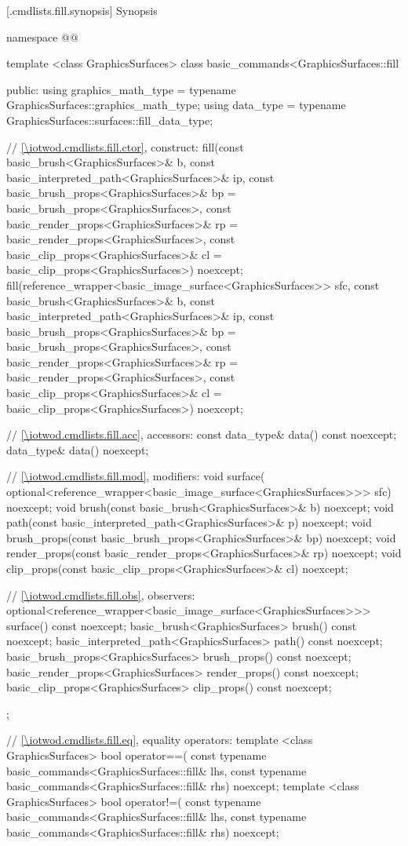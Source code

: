  [\iotwod.cmdlists.fill.synopsis] {Synopsis}
\begin{codeblock}
namespace @\fullnamespace{}@ {
  template <class GraphicsSurfaces>
  class basic_commands<GraphicsSurfaces::fill {
  public:
    using graphics_math_type = typename GraphicsSurfaces::graphics_math_type;
    using data_type = typename GraphicsSurfaces::surfaces::fill_data_type;

    // \ref{\iotwod.cmdlists.fill.ctor}, construct:
    fill(const basic_brush<GraphicsSurfaces>& b,
      const basic_interpreted_path<GraphicsSurfaces>& ip,
      const basic_brush_props<GraphicsSurfaces>& bp = 
      basic_brush_props<GraphicsSurfaces>{},
      const basic_render_props<GraphicsSurfaces>& rp = 
      basic_render_props<GraphicsSurfaces>{},
      const basic_clip_props<GraphicsSurfaces>& cl = 
      basic_clip_props<GraphicsSurfaces>{}) noexcept;
    fill(reference_wrapper<basic_image_surface<GraphicsSurfaces>> sfc,
      const basic_brush<GraphicsSurfaces>& b,
      const basic_interpreted_path<GraphicsSurfaces>& ip,
      const basic_brush_props<GraphicsSurfaces>& bp = 
      basic_brush_props<GraphicsSurfaces>{},
      const basic_render_props<GraphicsSurfaces>& rp = 
      basic_render_props<GraphicsSurfaces>{},
      const basic_clip_props<GraphicsSurfaces>& cl = 
      basic_clip_props<GraphicsSurfaces>{}) noexcept;
    
    // \ref{\iotwod.cmdlists.fill.acc}, accessors:
    const data_type& data() const noexcept;
    data_type& data() noexcept;

    // \ref{\iotwod.cmdlists.fill.mod}, modifiers:
    void surface(
      optional<reference_wrapper<basic_image_surface<GraphicsSurfaces>>> sfc) 
      noexcept;
    void brush(const basic_brush<GraphicsSurfaces>& b) noexcept;
    void path(const basic_interpreted_path<GraphicsSurfaces>& p) noexcept;
    void brush_props(const basic_brush_props<GraphicsSurfaces>& bp) noexcept;
    void render_props(const basic_render_props<GraphicsSurfaces>& rp) noexcept;
    void clip_props(const basic_clip_props<GraphicsSurfaces>& cl) noexcept;

    // \ref{\iotwod.cmdlists.fill.obs}, observers:
    optional<reference_wrapper<basic_image_surface<GraphicsSurfaces>>> 
      surface() const noexcept;
    basic_brush<GraphicsSurfaces> brush() const noexcept;
    basic_interpreted_path<GraphicsSurfaces> path() const noexcept;
    basic_brush_props<GraphicsSurfaces> brush_props() const noexcept;
    basic_render_props<GraphicsSurfaces> render_props() const noexcept;
    basic_clip_props<GraphicsSurfaces> clip_props() const noexcept;
  };

  // \ref{\iotwod.cmdlists.fill.eq}, equality operators:
  template <class GraphicsSurfaces>
  bool operator==(
    const typename basic_commands<GraphicsSurfaces::fill& lhs,
    const typename basic_commands<GraphicsSurfaces::fill& rhs) 
    noexcept;
  template <class GraphicsSurfaces>
  bool operator!=(
    const typename basic_commands<GraphicsSurfaces::fill& lhs,
    const typename basic_commands<GraphicsSurfaces::fill& rhs) 
    noexcept;
}
\end{codeblock}

